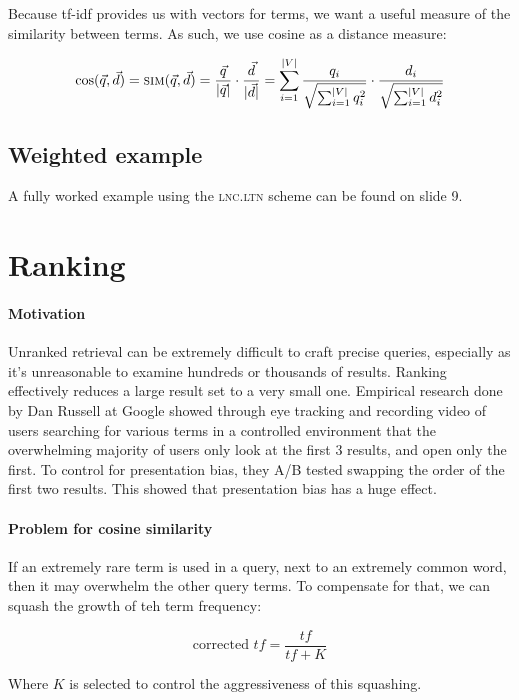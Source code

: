 \documentclass{idc_msc}
\begin{document}
Because tf-idf provides us with vectors for terms, we want a useful measure of the similarity between terms.
As such, we use cosine as a distance measure:

\[
\cos(\vec{q}, \vec{d}) = \textsc{sim}(\vec{q}, \vec{d}) =
\frac{\vec{q}}{|\vec{q}|} \cdot \frac{\vec{d}}{|\vec{d}|} =
\sum_{i = 1}^{|V|} \frac{q_i}{\sqrt{\sum_{i = 1}^{|V|} q_i^2}} \cdot \frac{d_i}{\sqrt{\sum_{i = 1}^{|V|} d_i^2}}
\]

\subsection{Weighted example}

A fully worked example using the \textsc{lnc.ltn} scheme can be found on slide 9.

\section{Ranking}

\paragraph{Motivation}

Unranked retrieval can be extremely difficult to craft precise queries, especially as it's unreasonable to examine hundreds or thousands of results.
Ranking effectively reduces a large result set to a very small one.
Empirical research done by Dan Russell at Google showed through eye tracking and recording video of users searching for various terms in a controlled environment that the overwhelming majority of users only look at the first 3 results, and open only the first.
To control for presentation bias, they A/B tested swapping the order of the first two results.
This showed that presentation bias has a huge effect.

\paragraph{Problem for cosine similarity}

If an extremely rare term is used in a query, next to an extremely common word, then it may overwhelm the other query terms.
To compensate for that, we can squash the growth of teh term frequency:

\[\text{corrected } tf = \frac{tf}{tf + K}\]

Where \(K\) is selected to control the aggressiveness of this squashing.
\end{document}
